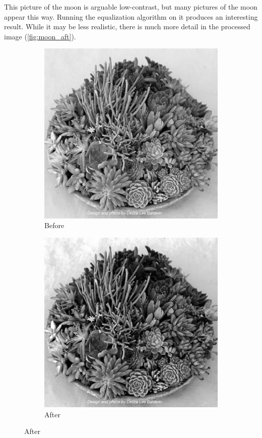 \documentclass[11pt,a4paper]{article}
\begin{document}
This picture of the moon is arguable low-contrast, but many pictures of the moon appear this way. Running the equalization algorithm on it produces an interesting result. While it may be less realistic, there is much more detail in the processed image (\ref{fig:moon_aft}).

\begin{figure}[ht]
	\centering
	\begin{subfigure}[h]{0.45\textwidth}
		\includegraphics[width=\textwidth]{figs/succs_gray}
		\caption{Before}
		\label{fig:succs_bef}
	\end{subfigure}
	\begin{subfigure}[h]{0.45\textwidth}
		\includegraphics[width=\textwidth]{figs/succs_ce}
		\caption{After}
		\label{fig:succs_aft}
	\end{subfigure}
	

\end{figure}
\end{document}
